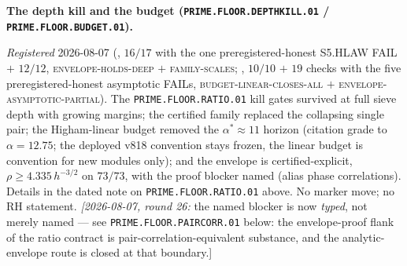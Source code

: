 \documentclass[11pt,a4paper]{article}
\begin{document}
\par\smallskip\noindent\textbf{The depth kill and the budget
(\texttt{PRIME.FLOOR.DEPTHKILL.01} /
\texttt{PRIME.FLOOR.BUDGET.01}).}
{\sloppy
\emph{Registered} 2026-08-07
(, $16/17$ with the one
preregistered-honest S5.HLAW FAIL $+$ $12/12$,
\textsc{envelope-holds-deep} $+$ \textsc{family-scales};
, $10/10$ $+$ $19$ checks
with the five preregistered-honest asymptotic FAILs,
\textsc{budget-linear-closes-all} $+$
\textsc{envelope-asymptotic-partial}).  The
\texttt{PRIME.FLOOR.RATIO.01} kill gates survived at full sieve
depth with growing margins; the certified family replaced the
collapsing single pair; the Higham-linear budget removed the
$\alpha^* \approx 11$ horizon (citation grade to $\alpha =
12.75$; the deployed v818 convention stays frozen, the linear
budget is convention for new modules only); and the envelope is
certified-explicit, $\rho \ge 4.335\,h^{-3/2}$ on $73/73$, with
the proof blocker named (alias phase correlations).  Details in
the dated note on \texttt{PRIME.FLOOR.RATIO.01} above.  No
marker move; no RH statement.  \emph{[2026-08-07, round 26:} the
named blocker is now \emph{typed}, not merely named --- see
\texttt{PRIME.FLOOR.PAIRCORR.01} below: the envelope-proof flank
of the ratio contract is pair-correlation-equivalent substance,
and the analytic-envelope route is closed at that boundary.]\par}
\end{document}
